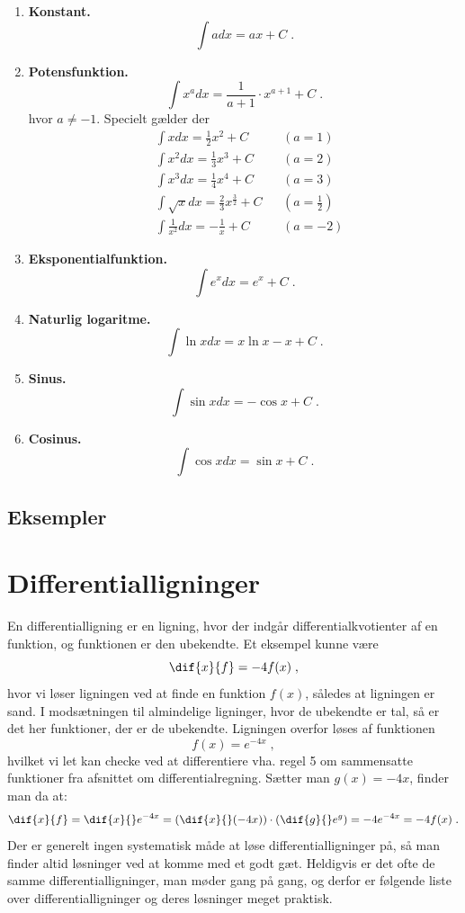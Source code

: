 \begin{enumerate}[resume]
	\item\label{itm:d-konstant} \textbf{Konstant.}\\
	\[
	\int a dx = ax + C \; .
	\]
	\item\label{itm:d-potens} \textbf{Potensfunktion.}\\
	\[
	\int x^a dx = \frac{1}{a+1}\cdot x^{a+1} + C\; .
	\]
	hvor $a \neq -1$. Specielt gælder der
	\begin{align*}
	&\int x dx = \frac{1}{2} x^2 + C&&(a=1)\\
	&\int x^2 dx = \frac{1}{3} x^3 + C&&(a=2)\\
	&\int x^3 dx = \frac{1}{4} x^4 + C &&(a=3)\\
	&\int \sqrt{x} dx = \frac{2}{3} x^{\frac{3}{2}} + C &&(a=\tfrac{1}{2})\\
	&\int \frac{1}{x^2} dx = - \frac{1}{x} + C &&(a=-2)
	\end{align*}
	\item\label{itm:d-exp} \textbf{Eksponentialfunktion.}\\
	\[
	\int e^x dx = e^x + C \; .
	\]
	\item\label{itm:d-ln} \textbf{Naturlig logaritme.}\\
	\[
	\int \ln x dx = x\ln x - x + C \; .
	\]
	\item\label{itm:d-sin} \textbf{Sinus.}\\
	\[
	\int \sin x dx = -\cos x  + C\; .
	\]
	\item\label{itm:d-cos} \textbf{Cosinus.}\\
	\[
	\int \cos x dx = \sin x + C\; .
	\]
\end{enumerate}

\subsection{Eksempler}

\section{Differentialligninger} \label{sec:difflign}
En differentialligning er en ligning, hvor der indgår
differentialkvotienter af en funktion, og funktionen er den
ubekendte. Et eksempel kunne være
\[
\dif{x}{f} = -4 f(x) \; ,
\]
hvor vi løser ligningen ved at finde en funktion $f(x)$, således at
ligningen er sand. I modsætningen til almindelige ligninger, hvor de
ubekendte er tal, så er det her funktioner, der er de
ubekendte. Ligningen overfor løses af funktionen
\[
f(x) = e^{-4x} \; ,
\]
hvilket vi let kan checke ved at differentiere vha. regel 5 om sammensatte funktioner fra afsnittet om differentialregning. Sætter man $g(x) = -4x$, finder man da at:
\[
\dif{x}{f} = \dif{x}{} e^{-4x}
= \left( \dif{x}{} (-4x) \right)  \cdot \left( \dif{g}{} e^{g} \right)
= -4 e^{-4x} = -4 f(x) \; .
\]
Der er generelt ingen systematisk måde at løse differentialligninger
på, så man finder altid løsninger ved at komme med et godt
gæt. Heldigvis er det ofte de samme differentialligninger, man møder
gang på gang, og derfor er følgende liste over differentialligninger
og deres løsninger meget praktisk.

